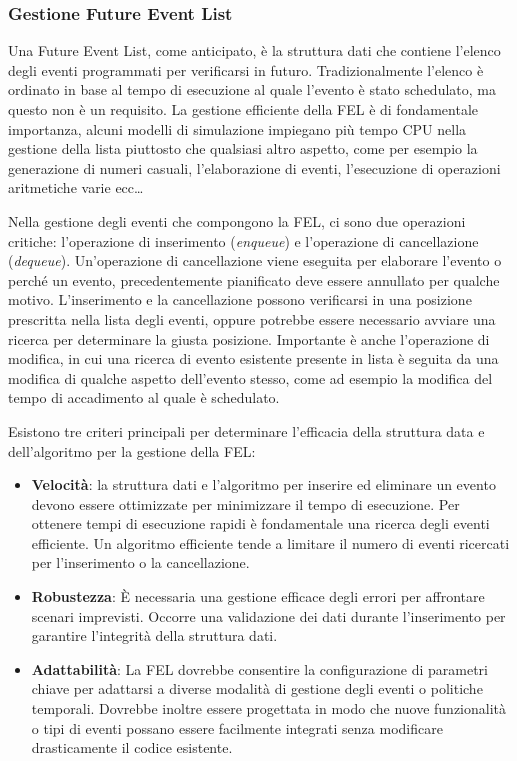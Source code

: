 \documentclass[12pt,a4paper,openright,twoside]{book}
\begin{document}
\subsubsection{Gestione Future Event List}
Una Future Event List, come anticipato, è la struttura dati che contiene l'elenco degli eventi programmati per verificarsi in futuro. Tradizionalmente l'elenco è ordinato in base al tempo di esecuzione al quale l'evento è stato schedulato, ma questo non è un requisito. 
La gestione efficiente della FEL è di fondamentale importanza, alcuni modelli di simulazione impiegano più tempo CPU nella gestione della lista piuttosto che qualsiasi altro aspetto, come per esempio la generazione di numeri casuali, l'elaborazione di eventi, l'esecuzione di operazioni aritmetiche varie ecc\dots

Nella gestione degli eventi che compongono la FEL, ci sono due operazioni critiche: l'operazione di inserimento (\textit{enqueue}) e l'operazione di cancellazione (\textit{dequeue}). Un'operazione di cancellazione viene eseguita per elaborare l'evento o perché un evento, precedentemente pianificato deve essere annullato per qualche motivo. L'inserimento e la cancellazione possono verificarsi in una posizione prescritta nella lista degli eventi, oppure potrebbe essere necessario avviare una ricerca per determinare la giusta posizione. 
Importante è anche l'operazione di modifica, in cui una ricerca di evento esistente presente in lista è seguita da una modifica di qualche aspetto dell'evento stesso, come ad esempio la modifica del tempo di accadimento al quale è schedulato. 

Esistono tre criteri principali per determinare l'efficacia della struttura data e dell'algoritmo per la gestione della FEL: 
\begin{itemize}
    \item \textbf{Velocità}: la struttura dati e l'algoritmo per inserire ed eliminare un evento devono essere ottimizzate per minimizzare il tempo di esecuzione. Per ottenere tempi di esecuzione rapidi è fondamentale una ricerca degli eventi efficiente. Un algoritmo efficiente tende a limitare il numero di eventi ricercati per l'inserimento o la cancellazione. 
    \item  \textbf{Robustezza}: È necessaria una gestione efficace degli errori per affrontare scenari imprevisti. Occorre una validazione dei dati durante l'inserimento per garantire l'integrità della struttura dati.  
    \item \textbf{Adattabilità}: La FEL dovrebbe consentire la configurazione di parametri chiave per adattarsi a diverse modalità di gestione degli eventi o politiche temporali. Dovrebbe inoltre essere progettata in modo che nuove funzionalità o tipi di eventi possano essere facilmente integrati senza modificare drasticamente il codice esistente. 
\end{itemize}
\end{document}
